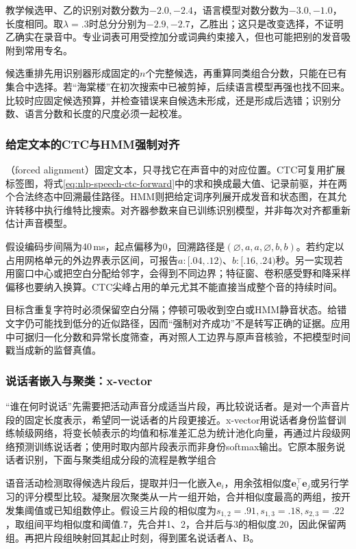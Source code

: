 教学候选甲、乙的识别对数分数为$-2.0,-2.4$，语言模型对数分数为$-3.0,-1.0$，长度相同。取$\lambda=.3$时总分分别为$-2.9,-2.7$，乙胜出；这只是改变选择，不证明乙确实在录音中。专业词表可用受控加分或词典约束接入，但也可能把别的发音吸附到常用专名。

候选重排先用识别器形成固定的$n$个完整候选，再重算同类组合分数，只能在已有集合中选择。若“海棠楼”在初次搜索中已被剪掉，后续语言模型再强也找不回来。比较时应固定候选预算，并检查错误来自候选未形成，还是形成后选错；识别分数、语言分数和长度的尺度必须一起校准。

\subsubsection{给定文本的CTC与HMM强制对齐}
\label{sec:nlp-speech-forced-alignment}

（forced alignment）固定文本，只寻找它在声音中的对应位置。CTC可复用扩展标签图，将式\eqref{eq:nlp-speech-ctc-forward}中的求和换成最大值、记录前驱，并在两个合法终态中回溯最佳路径。HMM则把给定词序列展开成发音和状态图，在其允许转移中执行维特比搜索。对齐器参数来自已训练识别模型，并非每次对齐都重新估计声音模型。

假设编码步间隔为40\,ms，起点偏移为0，回溯路径是$(\varnothing,a,a,\varnothing,b,b)$。若约定以占用网格单元的外边界表示区间，可报告$a:[.04,.12)$、$b:[.16,.24)$秒。另一实现若用窗口中心或把空白分配给邻字，会得到不同边界；特征窗、卷积感受野和降采样偏移也要纳入换算。CTC尖峰占用的单元尤其不能直接当成整个音的持续时间。

目标含重复字符时必须保留空白分隔；停顿可吸收到空白或HMM静音状态。给错文字仍可能找到低分的近似路径，因而“强制对齐成功”不是转写正确的证据。应用中可据归一化分数和异常长度筛查，再对照人工边界与原声音核验，不把模型时间戳当成新的监督真值。

\subsubsection{说话者嵌入与聚类：x-vector}
\label{sec:nlp-speech-xvector}

“谁在何时说话”先需要把活动声音分成适当片段，再比较说话者。是对一个声音片段的固定长度表示，希望同一说话者的片段更接近。x-vector用说话者身份监督训练帧级网络，将变长帧表示的均值和标准差汇总为统计池化向量，再通过片段级网络预测训练说话者；使用时取内部片段表示而非身份softmax输出。它原本服务说话者识别，下面与聚类组成分段的流程是教学组合

语音活动检测取得候选片段后，提取并归一化嵌入$\bm{e}_i$，用余弦相似度$\bm{e}_i^\top\bm{e}_j$或另行学习的评分模型比较。凝聚层次聚类从一片一组开始，合并相似度最高的两组，按开发集阈值或已知组数停止。假设三片段的相似度为$s_{1,2}=.91,s_{1,3}=.18,s_{2,3}=.22$，取组间平均相似度和阈值$.7$，先合并1、2，合并后与3的相似度$.20$，因此保留两组。再把片段组映射回其起止时刻，得到匿名说话者A、B。

